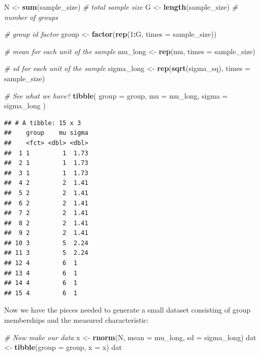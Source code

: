 \documentclass[
]{book}
\newenvironment{Shaded}{\begin{snugshade}}{\end{snugshade}}
\newcommand{\AttributeTok}[1]{\textcolor[rgb]{0.13,0.29,0.53}{#1}}
\newcommand{\CommentTok}[1]{\textcolor[rgb]{0.56,0.35,0.01}{\textit{#1}}}
\newcommand{\DecValTok}[1]{\textcolor[rgb]{0.00,0.00,0.81}{#1}}
\newcommand{\FunctionTok}[1]{\textcolor[rgb]{0.13,0.29,0.53}{\textbf{#1}}}
\newcommand{\NormalTok}[1]{#1}
\newcommand{\OtherTok}[1]{\textcolor[rgb]{0.56,0.35,0.01}{#1}}
\newcommand{\SpecialCharTok}[1]{\textcolor[rgb]{0.81,0.36,0.00}{\textbf{#1}}}
\begin{document}
\begin{Shaded}
\begin{Highlighting}[]
\NormalTok{N }\OtherTok{\textless{}{-}} \FunctionTok{sum}\NormalTok{(sample\_size) }\CommentTok{\# total sample size}
\NormalTok{G }\OtherTok{\textless{}{-}} \FunctionTok{length}\NormalTok{(sample\_size) }\CommentTok{\# number of groups}

\CommentTok{\# group id factor}
\NormalTok{group }\OtherTok{\textless{}{-}} \FunctionTok{factor}\NormalTok{(}\FunctionTok{rep}\NormalTok{(}\DecValTok{1}\SpecialCharTok{:}\NormalTok{G, }\AttributeTok{times =}\NormalTok{ sample\_size))}

\CommentTok{\# mean for each unit of the sample}
\NormalTok{mu\_long }\OtherTok{\textless{}{-}} \FunctionTok{rep}\NormalTok{(mu, }\AttributeTok{times =}\NormalTok{ sample\_size) }

\CommentTok{\# sd for each unit of the sample}
\NormalTok{sigma\_long }\OtherTok{\textless{}{-}} \FunctionTok{rep}\NormalTok{(}\FunctionTok{sqrt}\NormalTok{(sigma\_sq), }\AttributeTok{times =}\NormalTok{ sample\_size) }

\CommentTok{\# See what we have?}
\FunctionTok{tibble}\NormalTok{( }\AttributeTok{group =}\NormalTok{ group, }\AttributeTok{mu =}\NormalTok{ mu\_long, }\AttributeTok{sigma =}\NormalTok{ sigma\_long )}
\end{Highlighting}
\end{Shaded}

\begin{verbatim}
## # A tibble: 15 x 3
##    group    mu sigma
##    <fct> <dbl> <dbl>
##  1 1         1  1.73
##  2 1         1  1.73
##  3 1         1  1.73
##  4 2         2  1.41
##  5 2         2  1.41
##  6 2         2  1.41
##  7 2         2  1.41
##  8 2         2  1.41
##  9 2         2  1.41
## 10 3         5  2.24
## 11 3         5  2.24
## 12 4         6  1   
## 13 4         6  1   
## 14 4         6  1   
## 15 4         6  1
\end{verbatim}

Now we have the pieces needed to generate a small dataset consisting of group memberships and the measured characteristic:

\begin{Shaded}
\begin{Highlighting}[]
\CommentTok{\# Now make our data}
\NormalTok{x }\OtherTok{\textless{}{-}} \FunctionTok{rnorm}\NormalTok{(N, }\AttributeTok{mean =}\NormalTok{ mu\_long, }\AttributeTok{sd =}\NormalTok{ sigma\_long)}
\NormalTok{dat }\OtherTok{\textless{}{-}} \FunctionTok{tibble}\NormalTok{(}\AttributeTok{group =}\NormalTok{ group, }\AttributeTok{x =}\NormalTok{ x)}
\NormalTok{dat}
\end{Highlighting}
\end{Shaded}
\end{document}
